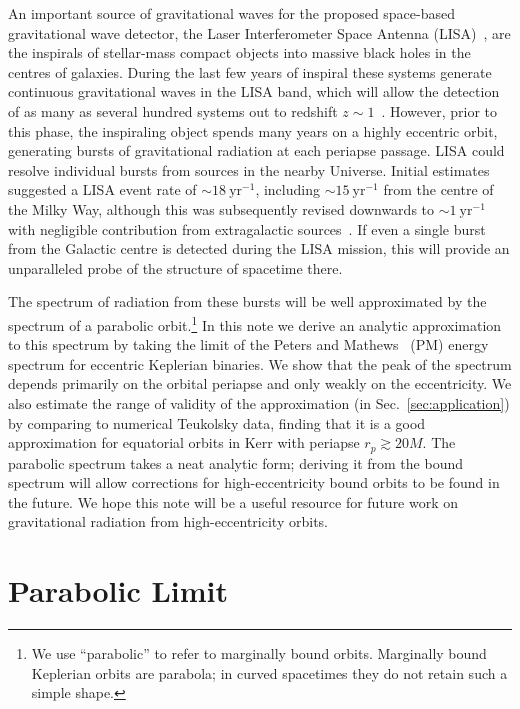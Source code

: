 \documentclass[aps,prd,amsfonts,amssymb,amsmath,nofootinbib,floatfix,reprint,showpacs,groupedaddress]{revtex4-1}
\newcommand{\secref}[1]{Sec.~\ref{sec:#1}}
\newcommand{\units}[1]{\ensuremath{~\mathrm{#1}}}
\begin{document}
An important source of gravitational waves for the proposed space-based gravitational wave detector, the Laser Interferometer Space Antenna (LISA)~\cite{Bender1998, Danzmann2003}, are the inspirals of stellar-mass compact objects into massive black holes in the centres of galaxies. During the last few years of inspiral these systems generate continuous gravitational waves in the LISA band, which will allow the detection of as many as several hundred systems out to redshift $z \sim 1$~\cite{Gair2009}. However, prior to this phase, the inspiraling object spends many years on a highly eccentric orbit, generating bursts of gravitational radiation at each periapse passage. LISA could resolve individual bursts from sources in the nearby Universe. Initial estimates~\cite{Rubbo2006} suggested a LISA event rate of $\sim18\units{yr^{-1}}$, including $\sim15\units{yr^{-1}}$ from the centre of the Milky Way, although this was subsequently revised downwards to $\sim1\units{yr^{-1}}$ with negligible contribution from extragalactic sources~\cite{Hopman2007}. If even a single burst from the Galactic centre is detected during the LISA mission, this will provide an unparalleled probe of the structure of spacetime there.

The spectrum of radiation from these bursts will be well approximated by the spectrum of a parabolic orbit.\footnote{We use ``parabolic'' to refer to marginally bound orbits. Marginally bound Keplerian orbits are parabola; in curved spacetimes they do not retain such a simple shape.} In this note we derive an analytic approximation to this spectrum by taking the limit of the Peters and Mathews~\cite{Peters1963, Peters1964} (PM) energy spectrum for eccentric Keplerian binaries. We show that the peak of the spectrum depends primarily on the orbital periapse and only weakly on the eccentricity. We also estimate the range of validity of the approximation (in \secref{application}) by comparing to numerical Teukolsky data, finding that it is a good approximation for equatorial orbits in Kerr with periapse $r_{p} \gtrsim 20M$. The parabolic spectrum takes a neat analytic form; deriving it from the bound spectrum will allow corrections for high-eccentricity bound orbits to be found in the future. We hope this note will be a useful resource for future work on gravitational radiation from high-eccentricity orbits.

\section{Parabolic Limit\label{sec:limit}}
\end{document}

